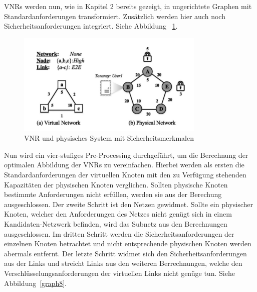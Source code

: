 \documentclass{lni}
\begin{document}
VNRs werden nun, wie in Kapitel 2 bereits gezeigt, in ungerichtete Graphen mit Standardanforderungen transformiert. Zusätzlich werden hier auch noch Sicherheitsanforderungen integriert. Siehe Abbildung ~\ref{graph7}.\newline

\begin{figure}[htb]
\begin{center}
\includegraphics[width=0.8\textwidth]{SVNR.pdf}\newline
\caption{\label{graph7}VNR und physisches System mit Sicherheitsmerkmalen \cite{wang2016towards}}
\end{center}
\end{figure}

Nun wird ein vier-stufiges Pre-Processing durchgeführt, um die Berechnung der optimalen Abbildung der VNRs zu vereinfachen. Hierbei werden als ersten die Standardanforderungen der virtuellen Knoten mit den zu Verfügung stehenden Kapazitäten der physischen Knoten verglichen. Sollten physische Knoten bestimmte Anforderungen nicht erfüllen, werden sie aus der Berechung ausgeschlossen. Der zweite Schritt ist den Netzen gewidmet. Sollte ein physischer Knoten, welcher den Anforderungen des Netzes nicht genügt sich in einem Kandidaten-Netzwerk befinden, wird das Subnetz aus den Berechnungen ausgeschlossen. Im dritten Schritt werden die Sicherheitsanforderungen der einzelnen Knoten betrachtet und nicht entsprechende physischen Knoten werden abermals entfernt. Der letzte Schritt widmet sich den Sicherheitsanforderungen aus der Links und streicht Links aus den weiteren Berrechnungen, welche den Verschlüsselungsanforderungen der virtuellen Links nicht genüge tun. Siehe Abbildung~\ref{graph8}. \newpage
\end{document}
